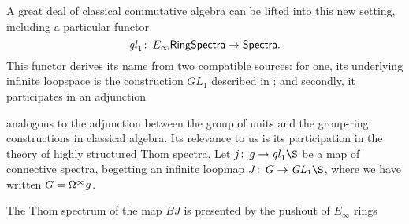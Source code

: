 A great deal of classical commutative algebra can be lifted into this new setting, including a particular functor \[\mathit{gl}_1\colon\thinspace E_\infty\mathsf{RingSpectra} \to \mathsf{Spectra}.\]  This functor derives its name from two compatible sources: for one, its underlying infinite loopspace is the construction $GL_1$ described in ; and secondly, it participates in an adjunction
\begin{center}
\end{center}
analogous to the adjunction between the group of units and the group-ring constructions in classical algebra.  Its relevance to us is its participation in the theory of highly structured Thom spectra.  Let $j\co g \to \gl_1 \S$ be a map of connective spectra, begetting an infinite loopmap $J\co G \to \GL_1 \S$, where we have written $G = \Omega^\infty g$.
\begin{lemma}
The Thom spectrum of the map $BJ$ is presented by the pushout of $E_\infty$ rings
\begin{center}
\end{center}
\end{lemma}

